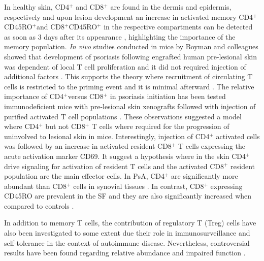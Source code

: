 {In healthy skin, CD4$^{+}$ and CD8$^{+}$ are found in the dermis and epidermis, respectively \parencite{Clark2006,Perera2012} and upon lesion development an increase in activated memory CD4$^{+}$CD45RO$^{+}$and CD8$^{+}$CD45RO$^{+}$ in the respective compartments can be detected as soon as 3 days after its appearance \parencite{Clark2006}, highlighting the importance of the memory population. \textit{In vivo} studies conducted in mice by Boyman and colleagues showed that development of psoriasis following engrafted human pre-lesional skin was dependent of local T cell proliferation and it did not required injection of additional factors \parencite{Boyle2013}. This supports the theory where recruitment of circulating T cells is restricted to the priming event and it is minimal afterward \parencite{Perera2012}. The relative importance of CD4$^{+}$versus CD8$^{+}$ in psoriasis initiation has been tested immunodeficient mice with pre-lesional skin xenografts followed with injection of purified activated T cell populations \parencite{Nickoloff1999}. These observations suggested a model where CD4$^{+}$ but not CD8$^{+}$ T cells where required for the progression of uninvolved to lesional skin in mice. Interestingly, injection of CD4$^{+}$ activated cells was followed by an increase in activated resident CD8$^{+}$ T cells expressing the acute activation marker CD69. It suggest a hypothesis where in the skin CD4$^{+}$ drive signaling for activation of resident T cells and the activated CD8$^{+}$ resident population are the main effector cells. In PsA, CD4$^{+}$ are significantly more abundant than CD8$^{+}$ cells in synovial tissues \parencite{Diani2015}. In contrast, CD8$^{+}$ expressing CD45RO are prevalent in the SF and they are also significantly increased when compared to controls \parencite{Costello1999}.

In addition to memory T cells, the contribution of regulatory T (Treg) cells have also been investigated to some extent due their role in immunosurveillance and self-tolerance in the context of autoimmune disease. Nevertheless, controversial results have been found regarding relative abundance and impaired function \parencite{Perera2012}. 

}
